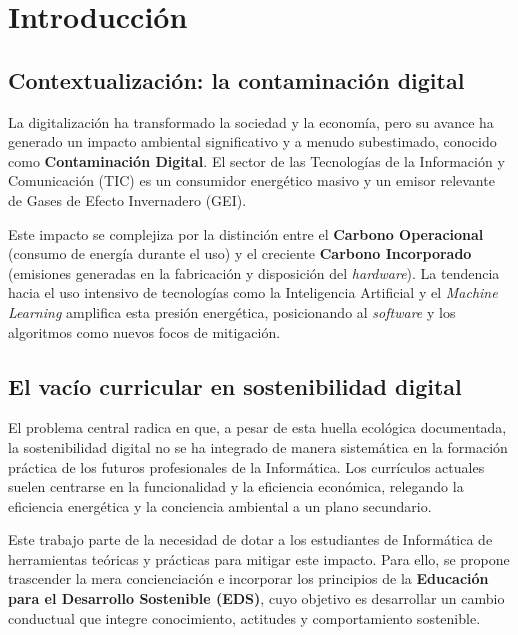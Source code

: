 \chapter{Introducción}
\label{cap:capitulo1}
\setcounter{page}{1}




\section{Contextualización: la contaminación digital}


La digitalización ha transformado la sociedad y la economía, pero su avance ha generado un impacto ambiental significativo y a menudo subestimado, conocido como \textbf{Contaminación Digital}. El sector de las Tecnologías de la Información y Comunicación (TIC) es un consumidor energético masivo y un emisor relevante de Gases de Efecto Invernadero (GEI).


Este impacto se complejiza por la distinción entre el \textbf{Carbono Operacional} (consumo de energía durante el uso) y el creciente \textbf{Carbono Incorporado} (emisiones generadas en la fabricación y disposición del \textit{hardware}). La tendencia hacia el uso intensivo de tecnologías como la Inteligencia Artificial y el \textit{Machine Learning} amplifica esta presión energética, posicionando al \textit{software} y los algoritmos como nuevos focos de mitigación.


\section{El vacío curricular en sostenibilidad digital}


El problema central radica en que, a pesar de esta huella ecológica documentada, la sostenibilidad digital no se ha integrado de manera sistemática en la formación práctica de los futuros profesionales de la Informática. Los currículos actuales suelen centrarse en la funcionalidad y la eficiencia económica, relegando la eficiencia energética y la conciencia ambiental a un plano secundario.

Este trabajo parte de la necesidad de dotar a los estudiantes de Informática de herramientas teóricas y prácticas para mitigar este impacto. Para ello, se propone trascender la mera concienciación e incorporar los principios de la \textbf{Educación para el Desarrollo Sostenible (EDS)}, cuyo objetivo es desarrollar un cambio conductual que integre conocimiento, actitudes y comportamiento sostenible.
